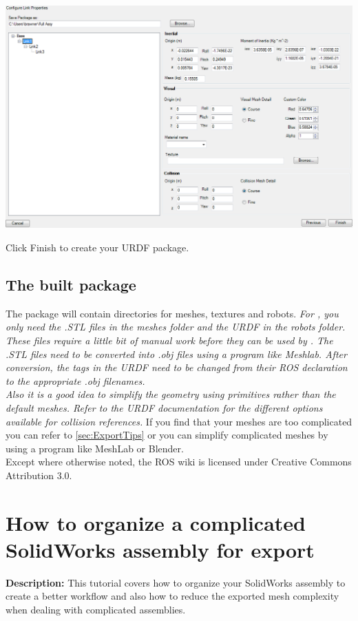 \includegraphics[width=\textwidth]{images/ExportLinkProperties}

Click Finish to create your URDF package.

\subsection{The built package}\label{sec:ExportBuiltPackage}
\indent The package will contain directories for meshes, textures and robots. 
\textit{
For \drake, you only need the .STL files in the meshes folder and the URDF in the robots folder.  These files require a little bit of manual work before they can be used by \drake.  The .STL files need to be converted into .obj files using a program like Meshlab.  After conversion, the  tags in the URDF need to be changed from their ROS declaration to the appropriate .obj filenames.  \\ \indent Also it is a good idea to simplify the  geometry using primitives rather than the default meshes.  Refer to the URDF documentation for the different options available for collision references.
} 
If you find that your meshes are too complicated you can refer to \autoref{sec:ExportTips} or you can simplify complicated meshes by using a program like MeshLab or Blender. 
\\

Except where otherwise noted, the ROS wiki is licensed under Creative Commons Attribution 3.0.

\section{How to organize a complicated SolidWorks assembly for export}\label{sec:ExportTips}
\textbf{Description:} This tutorial covers how to organize your SolidWorks assembly to create a better workflow and also how to reduce the exported mesh complexity when dealing with complicated assemblies.
\\

